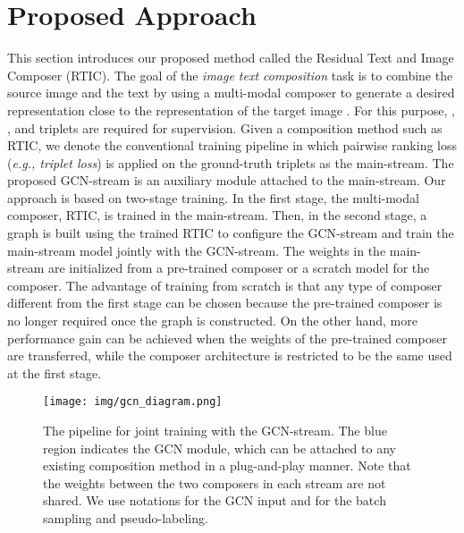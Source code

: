 \documentclass[10pt,twocolumn,letterpaper]{article}
\begin{document}
\section{Proposed Approach}
This section introduces our proposed method called the Residual Text and Image Composer (RTIC). The goal of the \textit{image text composition} task is to combine the source image  and the text  by using a multi-modal composer  to generate a desired representation close to the representation of the target image . For this purpose, , , and  triplets are required for supervision. Given a composition method such as RTIC, we denote the conventional training pipeline in which pairwise ranking loss (\textit{e.g., triplet loss}) is applied on the ground-truth triplets as the main-stream. The proposed GCN-stream is an auxiliary module attached to the main-stream. Our approach is based on two-stage training. In the first stage, the multi-modal composer, RTIC, is trained in the main-stream. Then, in the second stage, a graph is built using the trained RTIC to configure the GCN-stream and train the main-stream model jointly with the GCN-stream. The weights in the main-stream are initialized from a pre-trained composer or a scratch model for the composer. The advantage of training from scratch is that any type of composer different from the first stage can be chosen because the pre-trained composer is no longer required once the graph is constructed. On the other hand, more performance gain can be achieved when the weights of the pre-trained composer are transferred, while the composer architecture is restricted to be the same used at the first stage.

\begin{figure*}[t]
    \begin{center}
	    \texttt{[image: img/gcn\_diagram.png]}
	\end{center}
	\caption{The pipeline for joint training with the GCN-stream. The blue region indicates the GCN module, which can be attached to any existing composition method in a plug-and-play manner. Note that the weights between the two composers in each stream are not shared. We use notations  for the GCN input and  for the batch sampling and pseudo-labeling.}
	\label{fig:main_diagram}
\end{figure*}
\end{document}
